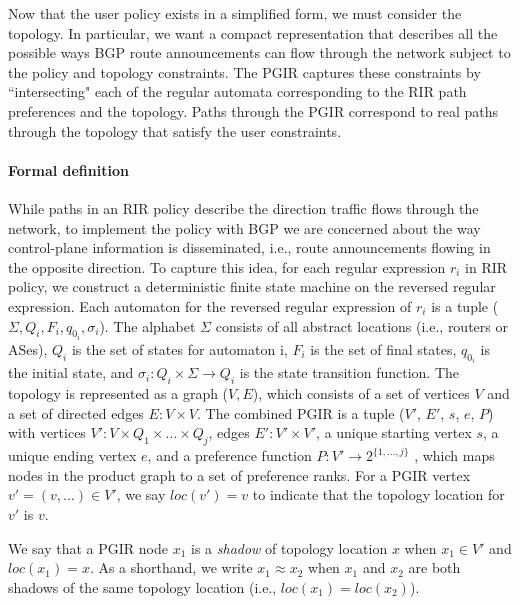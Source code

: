 \documentclass[10pt]{sigalternate052015}
\newcommand{\para}[1]{\paragraph*{\textbf{#1}}}
\newcommand{\set}[1]{\ensuremath{\{ #1 \} }}
\newcommand{\Prefer}{\texttt{>>}}
\begin{document}
Now that the user policy exists in a simplified form, we must consider the topology. In particular, we want a compact representation that describes all the possible ways BGP route announcements can flow through the network subject to the policy and topology constraints. The PGIR captures these constraints by ``intersecting" each of the regular automata corresponding to the RIR path preferences and the topology. Paths through the PGIR correspond to real paths through the topology that satisfy the user constraints.


\para{Formal definition}

While paths in an RIR policy describe the direction traffic flows through the network, to implement the policy with BGP we are concerned about the way control-plane information is disseminated, i.e., route announcements flowing in the opposite direction. To capture this idea, for each regular expression $r_i$ in RIR policy, we construct a deterministic finite state machine on the reversed regular expression. Each automaton for the reversed regular expression of $r_i$ is a tuple ($\Sigma, Q_i, F_i, q_{0_i}, \sigma_i$). The alphabet $\Sigma$ consists of all abstract locations (i.e., routers or ASes), $Q_i$ is the set of states for automaton i, $F_i$ is the set of final states, $q_{0_i}$ is the initial state, and $\sigma_i \colon Q_i \times \Sigma \rightarrow Q_i$ is the state transition function.
%
The topology is represented as a graph ($V, E$), which consists of a set of vertices $V$ and a set of directed edges $E \colon V \times V$.
%
The combined PGIR is a tuple ($V'$, $E'$, $s$, $e$, $P$) with
vertices $V' \colon V \times Q_1 \times \dots \times Q_j$,
edges $E' \colon V' \times V'$,
a unique starting vertex $s$,
a unique ending vertex $e$,
and a preference function $P \colon V' \rightarrow 2^{\set{1, \dots, j}}$ , which maps nodes in the product graph to a set of preference ranks.
For a PGIR vertex $v' = (v, \dots) \in V'$, we say $loc(v') = v$ to indicate that the topology location for $v'$ is $v$.

%
We say that a PGIR node $x_1$ is a \emph{shadow} of topology location $x$ when $x_1 \in V'$ and $loc(x_1) = x$. As a shorthand, we write $x_1 \approx x_2$ when $x_1$ and $x_2$ are both shadows of the same topology location (i.e., $loc(x_1) = loc(x_2)$).
%
\end{document}
